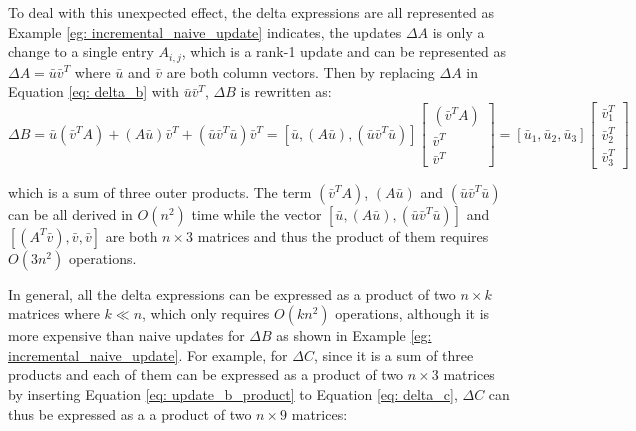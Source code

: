 To deal with this unexpected effect, the delta expressions are all represented as Example \ref{eg: incremental_naive_update} indicates, the updates $\Delta A$ is only a change to a single entry $A_{i,j}$, which is a rank-1 update and can be represented as $\Delta A = \bar{u}\bar{v}^T$ where $\bar{u}$ and $\bar{v}$ are both column vectors. Then by replacing $\Delta A$ in Equation \ref{eq: delta_b} with $\bar{u}\bar{v}^T$, $\Delta B$ is rewritten as:
\begin{equation}\label{eq: update_b_product}
\Delta B = \bar{u}(\bar{v}^TA) + (A\bar{u})\bar{v}^T + (\bar{u}\bar{v}^T\bar{u})\bar{v}^T=[\bar{u}, (A\bar{u}), (\bar{u}\bar{v}^T\bar{u})]
\begin{bmatrix}
    (\bar{v}^TA)  \\
    \bar{v}^T  \\
    \bar{v}^T   
\end{bmatrix}
=[\bar{u}_1, \bar{u}_2, \bar{u}_3]
\begin{bmatrix}
    \bar{v}^T_1  \\
    \bar{v}^T_2  \\
    \bar{v}^T_3  
\end{bmatrix}
\end{equation}

which is a sum of three outer products. The term $(\bar{v}^TA)$, $(A\bar{u})$ and $(\bar{u}\bar{v}^T\bar{u})$ can be all derived in $O(n^2)$ time while the vector $[\bar{u}, (A\bar{u}), (\bar{u}\bar{v}^T\bar{u})]$ and $[(A^T\bar{v}), \bar{v}, \bar{v}]$ are both $n \times 3$ matrices and thus the product of them requires $O(3n^2)$ operations.

In general, all the delta expressions can be expressed as a product of two $n \times k$ matrices where $k \ll n$, which only requires $O(kn^2)$ operations, although it is more expensive than naive updates for $\Delta B$ as shown in Example \ref{eg: incremental_naive_update}. For example, for $\Delta C$, since it is a sum of three products and each of them can be expressed as a product of two $n \times 3$ matrices by inserting Equation \ref{eq: update_b_product} to Equation \ref{eq: delta_c}, $\Delta C$ can thus be expressed as a a product of two $n \times 9$ matrices:


